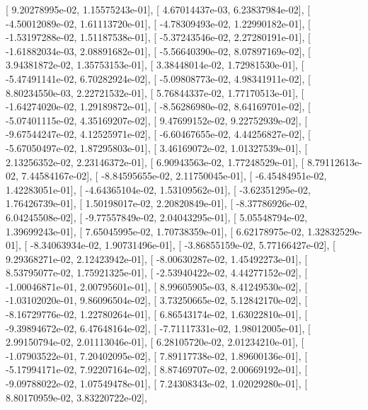 \documentclass{article}
\begin{document}
       [  9.20278995e-02,   1.15575243e-01],
       [  4.67014437e-03,   6.23837984e-02],
       [ -4.50012089e-02,   1.61113720e-01],
       [ -4.78309493e-02,   1.22990182e-01],
       [ -1.53197288e-02,   1.51187538e-01],
       [ -5.37243546e-02,   2.27280191e-01],
       [ -1.61882034e-03,   2.08891682e-01],
       [ -5.56640390e-02,   8.07897169e-02],
       [  3.94381872e-02,   1.35753153e-01],
       [  3.38448014e-02,   1.72981530e-01],
       [ -5.47491141e-02,   6.70282924e-02],
       [ -5.09808773e-02,   4.98341911e-02],
       [  8.80234550e-03,   2.22721532e-01],
       [  5.76844337e-02,   1.77170513e-01],
       [ -1.64274020e-02,   1.29189872e-01],
       [ -8.56286980e-02,   8.64169701e-02],
       [ -5.07401115e-02,   4.35169207e-02],
       [  9.47699152e-02,   9.22752939e-02],
       [ -9.67544247e-02,   4.12525971e-02],
       [ -6.60467655e-02,   4.44256827e-02],
       [ -5.67050497e-02,   1.87295803e-01],
       [  3.46169072e-02,   1.01327539e-01],
       [  2.13256352e-02,   2.23146372e-01],
       [  6.90943563e-02,   1.77248529e-01],
       [  8.79112613e-02,   7.44584167e-02],
       [ -8.84595655e-02,   2.11750045e-01],
       [ -6.45484951e-02,   1.42283051e-01],
       [ -4.64365104e-02,   1.53109562e-01],
       [ -3.62351295e-02,   1.76426739e-01],
       [  1.50198017e-02,   2.20820849e-01],
       [ -8.37786926e-02,   6.04245508e-02],
       [ -9.77557849e-02,   2.04043295e-01],
       [  5.05548794e-02,   1.39699243e-01],
       [  7.65045995e-02,   1.70738359e-01],
       [  6.62178975e-02,   1.32832529e-01],
       [ -8.34063934e-02,   1.90731496e-01],
       [ -3.86855159e-02,   5.77166427e-02],
       [  9.29368271e-02,   2.12423942e-01],
       [ -8.00630287e-02,   1.45492273e-01],
       [  8.53795077e-02,   1.75921325e-01],
       [ -2.53940422e-02,   4.44277152e-02],
       [ -1.00046871e-01,   2.00795601e-01],
       [  8.99605905e-03,   8.41249530e-02],
       [ -1.03102020e-01,   9.86096504e-02],
       [  3.73250665e-02,   5.12842170e-02],
       [ -8.16729776e-02,   1.22780264e-01],
       [  6.86543174e-02,   1.63022810e-01],
       [ -9.39894672e-02,   6.47648164e-02],
       [ -7.71117331e-02,   1.98012005e-01],
       [  2.99150794e-02,   2.01113046e-01],
       [  6.28105720e-02,   2.01234210e-01],
       [ -1.07903522e-01,   7.20402095e-02],
       [  7.89117738e-02,   1.89600136e-01],
       [ -5.17994171e-02,   7.92207164e-02],
       [  8.87469707e-02,   2.00669192e-01],
       [ -9.09788022e-02,   1.07549478e-01],
       [  7.24308343e-02,   1.02029280e-01],
       [  8.80170959e-02,   3.83220722e-02],
\end{document}
